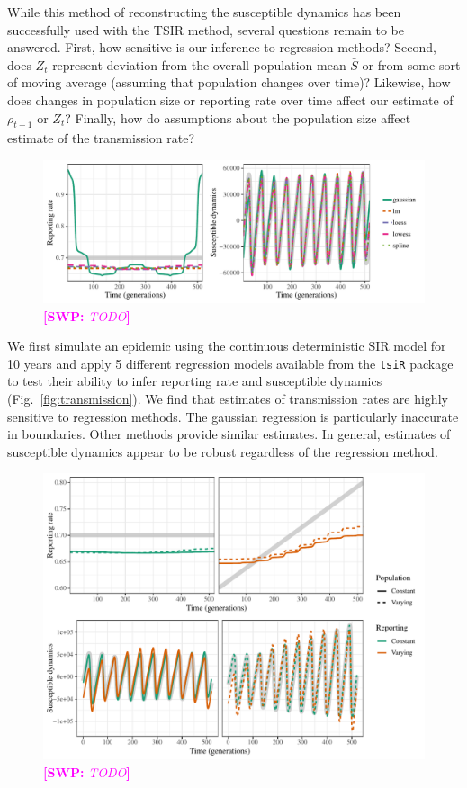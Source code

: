 \documentclass{article}
\newcommand{\fref}[1]{Fig.~\ref{fig:#1}}
\newcommand{\comment}[3]{\textcolor{#1}{\textbf{[#2: }\textsl{#3}\textbf{]}}}
\newcommand{\swp}[1]{\comment{magenta}{SWP}{#1}}
\begin{document}
While this method of reconstructing the susceptible dynamics has been successfully used with the TSIR method, 
several questions remain to be answered.
First, how sensitive is our inference to regression methods?
Second, does $Z_t$ represent deviation from the overall population mean $\bar{S}$ or from some sort of moving average (assuming that population changes over time)?
Likewise, how does changes in population size or reporting rate over time affect our estimate of $\rho_{t+1}$ or $Z_t$?
Finally, how do assumptions about the population size affect estimate of the transmission rate?

\begin{figure}
\includegraphics[width=\textwidth]{../figure/susceptible_reconstruction_tsir.pdf}
\caption{
\swp{TODO}
}
\label{fig:tsirrecon}
\end{figure}

We first simulate an epidemic using the continuous deterministic SIR model for 10 years and apply 5 different regression models available from the \texttt{tsiR} package to test their ability to infer reporting rate and susceptible dynamics (\fref{transmission}).
We find that estimates of transmission rates are highly sensitive to regression methods.
The gaussian regression is particularly inaccurate in boundaries.
Other methods provide similar estimates.
In general, estimates of susceptible dynamics appear to be robust regardless of the regression method.

\begin{figure}
\includegraphics[width=\textwidth]{../figure/susceptible_reconstruction_compare.pdf}
\caption{
\swp{TODO}
}
\label{fig:tsircomp}
\end{figure}
\end{document}
